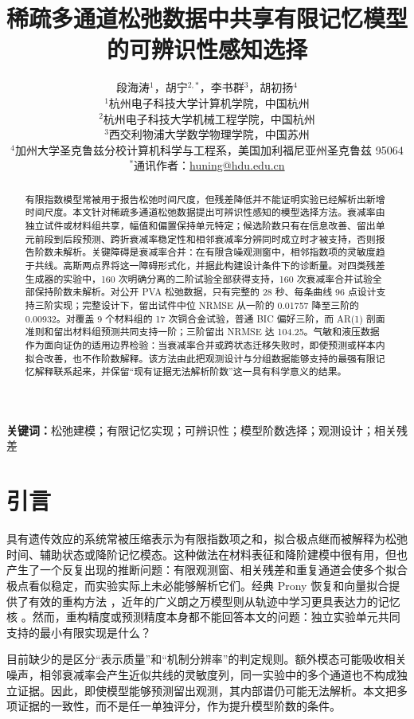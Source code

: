 \documentclass[UTF8,11pt]{ctexart}
\title{稀疏多通道松弛数据中共享有限记忆模型的可辨识性感知选择}
\author{段海涛$^{1}$，胡宁$^{2,*}$，李书群$^{3}$，胡初扬$^{4}$\\[2mm]
\small $^1$杭州电子科技大学计算机学院，中国杭州\\
\small $^2$杭州电子科技大学机械工程学院，中国杭州\\
\small $^3$西交利物浦大学数学物理学院，中国苏州\\
\small $^4$加州大学圣克鲁兹分校计算机科学与工程系，美国加利福尼亚州圣克鲁兹 95064\\[1mm]
\small $^*$通讯作者：\href{mailto:huning@hdu.edu.cn}{huning@hdu.edu.cn}}
\date{}
\begin{document}
\maketitle

\begin{abstract}
有限指数模型常被用于报告松弛时间尺度，但残差降低并不能证明实验已经解析出新增时间尺度。本文针对稀疏多通道松弛数据提出可辨识性感知的模型选择方法。衰减率由独立试件或材料组共享，幅值和偏置保持单元特定；候选阶数只有在信息改善、留出单元前段到后段预测、跨折衰减率稳定性和相邻衰减率分辨同时成立时才被支持，否则报告阶数未解析。关键障碍是衰减率合并：在有限含噪观测窗中，相邻指数项的灵敏度趋于共线。高斯两点界将这一障碍形式化，并据此构建设计条件下的诊断量。对四类残差生成器的实验中，160 次明确分离的二阶试验全部获得支持，160 次衰减率合并试验全部保持阶数未解析。对公开 PVA 松弛数据，只有完整的 28 秒、每条曲线 96 点设计支持三阶实现；完整设计下，留出试件中位 NRMSE 从一阶的 0.01757 降至三阶的 0.00932。对覆盖 9 个材料组的 17 次铜合金试验，普通 BIC 偏好三阶，而 AR(1) 剖面准则和留出材料组预测共同支持一阶；三阶留出 NRMSE 达 104.25。气敏和液压数据作为面向证伪的适用边界检验：当衰减率合并或跨状态迁移失败时，即使预测或样本内拟合改善，也不作阶数解释。该方法由此把观测设计与分组数据能够支持的最强有限记忆解释联系起来，并保留“现有证据无法解析阶数”这一具有科学意义的结果。
\end{abstract}

\noindent\textbf{关键词：}松弛建模；有限记忆实现；可辨识性；模型阶数选择；观测设计；相关残差

\section{引言}
具有遗传效应的系统常被压缩表示为有限指数项之和，拟合极点继而被解释为松弛时间、辅助状态或降阶记忆模态。这种做法在材料表征和降阶建模中很有用，但也产生了一个反复出现的推断问题：有限观测窗、相关残差和重复通道会使多个拟合极点看似稳定，而实验实际上未必能够解析它们。经典 Prony 恢复和向量拟合提供了有效的重构方法 \cite{stampfer2020gop,gustavsen1999vector,bosner2021parallel}，近年的广义朗之万模型则从轨迹中学习更具表达力的记忆核 \cite{lei2016parameterization,ge2024state,lang2026learning}。然而，重构精度或预测精度本身都不能回答本文的问题：独立实验单元共同支持的最小有限实现是什么？

目前缺少的是区分“表示质量”和“机制分辨率”的判定规则。额外模态可能吸收相关噪声，相邻衰减率会产生近似共线的灵敏度列，同一实验中的多个通道也不构成独立证据。因此，即使模型能够预测留出观测，其内部谱仍可能无法解析。本文把多项证据的一致性，而不是任一单独评分，作为提升模型阶数的条件。
\end{document}
